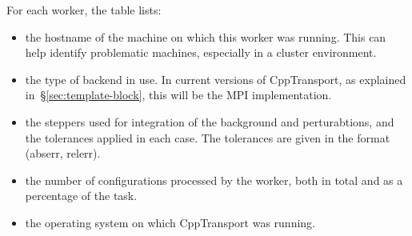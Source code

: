 \documentclass[11pt,a4paper]{article}
\newcommand{\packagefont}{\sffamily}
\newcommand{\CppTransport}{{\packagefont CppTransport}}
\newcommand{\MPI}{{\packagefont MPI}}
\begin{document}
For each worker, the table lists:
\begin{itemize}
    \item the hostname of the machine on which this worker was running.
    This can help identify problematic machines, especially in a cluster environment.
    
    \item the type of backend in use. In current versions of {\CppTransport},
    as explained in~\S\ref{sec:template-block}, this will be the
    {\MPI} implementation.
    
    \item the steppers used for integration of the background and perturabtions,
    and the tolerances applied in each case.
    The tolerances are given in the format
    (abserr, relerr).
    
    \item the number of configurations processed by the worker,
    both in total and as a percentage of the task.
    
    \item the operating system on which {\CppTransport} was running.
\end{itemize}
\end{document}

